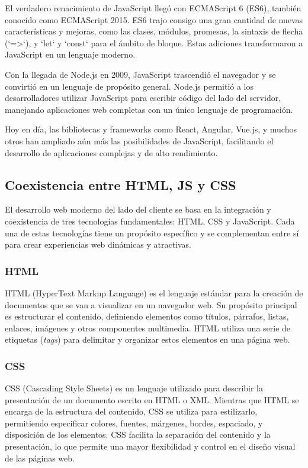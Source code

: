 \documentclass{book}
\begin{document}
El verdadero renacimiento de JavaScript llegó con ECMAScript 6 (ES6), también conocido como ECMAScript 2015. ES6 trajo consigo una gran cantidad de nuevas características y mejoras, como las clases, módulos, promesas, la sintaxis de flecha (`=>`), y `let` y `const` para el ámbito de bloque. Estas adiciones transformaron a JavaScript en un lenguaje moderno.

Con la llegada de Node.js en 2009, JavaScript trascendió el navegador y se convirtió en un lenguaje de propósito general. Node.js permitió a los desarrolladores utilizar JavaScript para escribir código del lado del servidor, manejando aplicaciones web completas con un único lenguaje de programación.

Hoy en día, las bibliotecas y frameworks como React, Angular, Vue.js, y muchos otros han ampliado aún más las posibilidades de JavaScript, facilitando el desarrollo de aplicaciones complejas y de alto rendimiento.

\subsection{Coexistencia entre HTML, JS y CSS}

El desarrollo web moderno del lado del cliente se basa en la integración y coexistencia de tres tecnologías fundamentales: HTML, CSS y JavaScript. Cada una de estas tecnologías tiene un propósito específico y se complementan entre sí para crear experiencias web dinámicas y atractivas.

\subsubsection{HTML}

HTML\cite{mdn_html} (HyperText Markup Language) es el lenguaje estándar para la creación de documentos que se van a visualizar en un navegador web. Su propósito principal es estructurar el contenido, definiendo elementos como títulos, párrafos, listas, enlaces, imágenes y otros componentes multimedia. HTML utiliza una serie de etiquetas (\textit{tags}) para delimitar y organizar estos elementos en una página web.

\subsubsection{CSS}

CSS\cite{mdn_css} (Cascading Style Sheets) es un lenguaje utilizado para describir la presentación de un documento escrito en HTML o XML. Mientras que HTML se encarga de la estructura del contenido, CSS se utiliza para estilizarlo, permitiendo especificar colores, fuentes, márgenes, bordes, espaciado, y disposición de los elementos. CSS facilita la separación del contenido y la presentación, lo que permite una mayor flexibilidad y control en el diseño visual de las páginas web.
\end{document}
